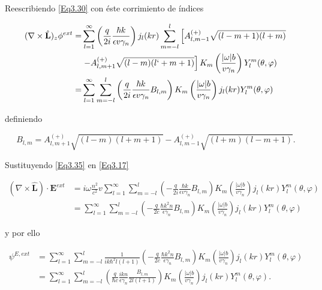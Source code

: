 \documentclass[a4paper,10pt]{article}
\newcommand{\hatbf}[1] {\hat{\mathbf{#1}}}	%
\begin{document}
Reescribiendo \eqref{Eq3.30} con éste corrimiento de índices

\begin{subequations}
\begin{align}
(\nabla\times\hatbf{L})_z\phi^{ext}
=&\sum_{l=1}^{\infty}\left(\frac{q}{2i}\frac{\hbar k}{\epsilon v\gamma_n}\right)j_l(kr)\sum_{m=-l}^l \left[A_{l,m-1}^{(+)}\sqrt{(l-m+1)(l+m)}\right.	\\
&\left. -A_{l,m+1}^{(+)}\sqrt{(l-m)(l`+m+1)}\right] K_m\left( \frac{|\omega|b}{v\gamma_n} \right) Y_l^{m}(\theta,\varphi)	\\
=& \sum_{l=1}^{\infty}\sum_{m=-l}^l \left(\frac{q}{2i}\frac{\hbar k}{\epsilon v\gamma_n}B_{l,m}\right)K_m\left( \frac{|\omega|b}{v\gamma_n} \right) j_l(kr) Y_l^{m}(\theta,\varphi)
\end{align}
\label{Eq3.35}
\end{subequations}

definiendo

\begin{equation}
B_{l,m}=A_{l,m+1}^{(+)}\sqrt{(l-m)(l+m+1)}-A_{l,m-1}^{(+)}\sqrt{(l+m)(l-m+1)}.
\end{equation}

Sustituyendo \eqref{Eq3.35} en \eqref{Eq3.17}

\begin{subequations}
\begin{align}
(\nabla\times\hatbf{L})\cdot\textbf{E}^{ext}
&=i\omega\frac{n^2}{c^2}v\sum_{l=1}^{\infty}\sum_{m=-l}^l \left(-\frac{q}{2i}\frac{\hbar k}{\epsilon v\gamma_n}B_{l,m}\right)K_m\left( \frac{|\omega|b}{v\gamma_n} \right) j_l(kr) Y_l^{m}(\theta,\varphi)	\\
&=\sum_{l=1}^{\infty}\sum_{m=-l}^l \left(-\frac{q}{2c}\frac{\hbar k^2 n}{\epsilon\gamma_n}B_{l,m}\right)K_m\left( \frac{|\omega|b}{v\gamma_n} \right) j_l(kr) Y_l^{m}(\theta,\varphi)
\end{align}
\end{subequations}

y por ello

\begin{subequations}
\begin{align}
\psi^{E,ext}
&=\sum_{l=1}^{\infty}\sum_{m=-l}^l\frac{1}{ik\hbar^2l(l+1)} \left(-\frac{q}{2c}\frac{\hbar k^2 n}{\epsilon\gamma_n}B_{l,m}\right)K_m\left( \frac{|\omega|b}{v\gamma_n} \right) j_l(kr) Y_l^{m}(\theta,\varphi)	\\
&=\sum_{l=1}^{\infty}\sum_{m=-l}^l\left(\frac{q}{\hbar c}\frac{ ik n}{\epsilon\gamma_n}\frac{B_{l,m}}{2l(l+1)}\right)K_m\left( \frac{|\omega|b}{v\gamma_n} \right) j_l(kr) Y_l^{m}(\theta,\varphi).
\end{align}
\label{Eq3.38}
\end{subequations}
\end{document}
